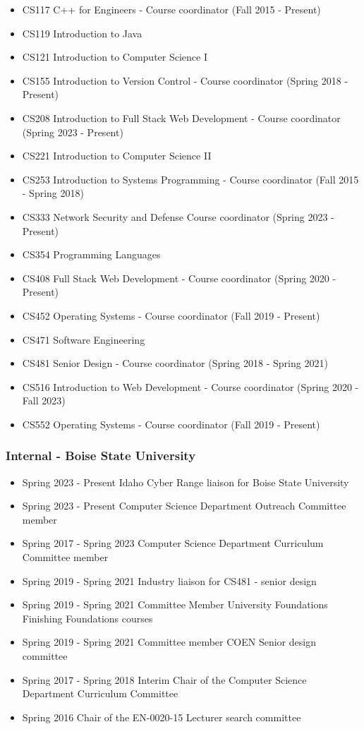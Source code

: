 \documentclass{shanep}
\begin{document}

\begin{itemize}
  \item CS117 C++ for Engineers - Course coordinator (Fall 2015 - Present)
  \item CS119 Introduction to Java
  \item CS121 Introduction to Computer Science I
  \item CS155 Introduction to Version Control - Course coordinator (Spring 2018 - Present)
  \item CS208 Introduction to Full Stack Web Development - Course coordinator (Spring 2023 - Present)
  \item CS221 Introduction to Computer Science II
  \item CS253 Introduction to Systems Programming - Course coordinator (Fall 2015 - Spring 2018)
  \item CS333 Network Security and Defense Course coordinator (Spring 2023 - Present)
  \item CS354 Programming Languages
  \item CS408 Full Stack Web Development - Course coordinator (Spring 2020 - Present)
  \item CS452 Operating Systems - Course coordinator (Fall 2019 - Present)
  \item CS471 Software Engineering
  \item CS481 Senior Design - Course coordinator (Spring 2018 - Spring 2021)
  \item CS516 Introduction to Web Development - Course coordinator (Spring 2020 - Fall 2023)
  \item CS552 Operating Systems - Course coordinator (Fall 2019 - Present)
\end{itemize}


\subsubsection*{Internal - Boise State University}
\begin{itemize}
  \item Spring 2023 - Present Idaho Cyber Range liaison for Boise State University
  \item Spring 2023 - Present Computer Science Department Outreach Committee member
  \item Spring 2017 - Spring 2023 Computer Science Department Curriculum Committee member
  \item Spring 2019 - Spring 2021 Industry liaison for CS481 - senior design
  \item Spring 2019 - Spring 2021 Committee Member University Foundations Finishing Foundations courses
  \item Spring 2019 - Spring 2021 Committee member COEN Senior design committee
  \item Spring 2017 - Spring 2018 Interim Chair of the Computer Science Department Curriculum Committee
  \item Spring 2016 Chair of the EN-0020-15 Lecturer search committee
\end{itemize}
\end{document}
